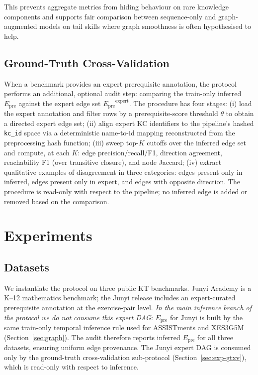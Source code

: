 \documentclass[pdflatex,sn-basic]{sn-jnl}
\newcommand{\Epre}{\ensuremath{E_{\text{pre}}}}
\newcommand{\KCs}{knowledge components}
\begin{document}
This prevents aggregate metrics from hiding behaviour on rare \KCs{} and
supports fair comparison between sequence-only and graph-augmented models
on tail skills where graph smoothness is often hypothesised to help.
\subsection{Ground-Truth Cross-Validation}
\label{sec:gtxv-protocol}
When a benchmark provides an expert prerequisite annotation, the
protocol performs an additional, optional audit step: comparing the
train-only inferred $\Epre$ against the expert edge set
$\Epre^{\text{expert}}$. The procedure has four stages:
(i) load the expert annotation and filter rows by a prerequisite-score
threshold $\theta$ to obtain a directed expert edge set;
(ii) align expert KC identifiers to the pipeline's hashed \texttt{kc\_id}
space via a deterministic name-to-id mapping reconstructed from the
preprocessing hash function;
(iii) sweep top-$K$ cutoffs over the inferred edge set and compute,
at each $K$: edge precision/recall/F1, direction agreement, reachability
F1 (over transitive closure), and node Jaccard;
(iv) extract qualitative examples of disagreement in three categories:
edges present only in inferred, edges present only in expert, and edges
with opposite direction.
The procedure is read-only with respect to the pipeline; no
inferred edge is added or removed based on the comparison.
\section{Experiments}
\label{sec:exp}
\subsection{Datasets}
\label{sec:datasets}
We instantiate the protocol on three public KT benchmarks. Junyi Academy
\cite{junyi_dataset} is a K--12 mathematics benchmark; the Junyi release
includes an expert-curated prerequisite annotation at the
exercise-pair level. \emph{In the main inference branch of the protocol
we do not consume this expert DAG}: $\Epre$ for Junyi is built by the
same train-only temporal inference rule used for ASSISTments and
XES3G5M (Section~\ref{sec:graph}). The audit therefore reports inferred
$\Epre$ for all three datasets, ensuring uniform edge provenance. The
Junyi expert DAG is consumed only by the ground-truth cross-validation
sub-protocol (Section~\ref{sec:exp-gtxv}), which is read-only with
respect to inference.
\end{document}
